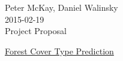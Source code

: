 \documentclass{article}
\begin{document}
\begin{center}
Peter McKay, Daniel Walinsky\\
2015-02-19\\
\Large Project Proposal
\end{center}

\bigskip
\href{http://www.kaggle.com/c/forest-cover-type-prediction}{Forest Cover Type Prediction}
\end{document}
